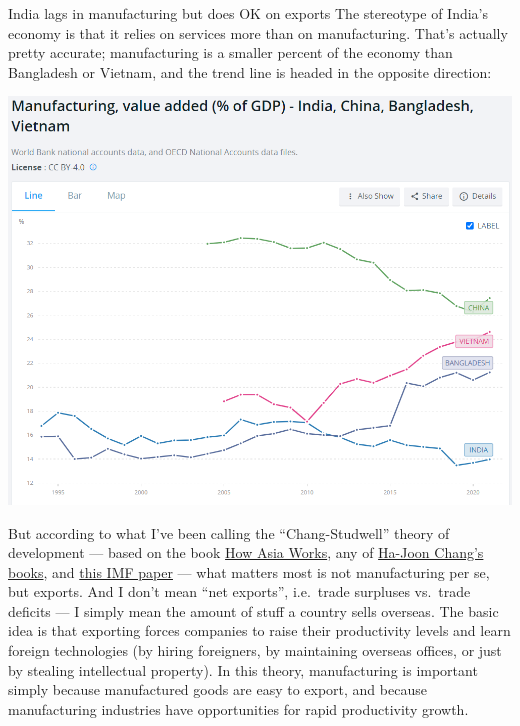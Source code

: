 \documentclass[
]{book}
\begin{document}
India lags in manufacturing but does OK on exports
The stereotype of India's economy is that it relies on services more than on manufacturing. That's actually pretty accurate; manufacturing is a smaller percent of the economy than Bangladesh or Vietnam, and the trend line is headed in the opposite direction:

\includegraphics{fig/manufacturing_india_china_bangladesh_vietnam.png}

But according to what I've been calling the ``Chang-Studwell'' theory of development --- based on the book \href{https://www.amazon.com/How-Asia-Works-Joe-Studwell/dp/0802121322}{How Asia Works}, any of \href{https://www.amazon.com/stores/Ha-Joon-Chang/author/B001HOFPKS?ref=ap_rdr\&store_ref=ap_rdr\&isDramIntegrated=true\&shoppingPortalEnabled=true}{Ha-Joon Chang's books}, and \href{https://www.imf.org/en/Publications/WP/Issues/2019/03/26/The-Return-of-the-Policy-That-Shall-Not-Be-Named-Principles-of-Industrial-Policy-46710}{this IMF paper} --- what matters most is not manufacturing per se, but exports. And I don't mean ``net exports'', i.e.~trade surpluses vs.~trade deficits --- I simply mean the amount of stuff a country sells overseas. The basic idea is that exporting forces companies to raise their productivity levels and learn foreign technologies (by hiring foreigners, by maintaining overseas offices, or just by stealing intellectual property). In this theory, manufacturing is important simply because manufactured goods are easy to export, and because manufacturing industries have opportunities for rapid productivity growth.
\end{document}
